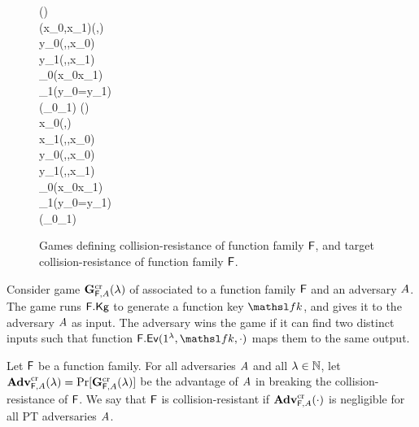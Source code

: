 
\begin{figure}[t]
{
\vspace{-1.0em} %
  {
    \FKey\getsr\Kg{\FF}(\secIn)\\
	(x_0,x_1)\getsr\advA(\secIn,\FKey)\\
	y_0\gets\Ev{\FF}(\secIn,\FKey,x_0)\\
	y_1\gets\Ev{\FF}(\secIn,\FKey,x_1)\\
	\win_0\gets(x_0\neq x_1)\\
	\win_1\gets(y_0=y_1)\\
	\pcreturn (\win_0\land\win_1)
  }
}
{
\vspace{-1.0em} %
  {
    \FKey\getsr\Kg{\FF}(\secIn)\\
	x_0\getsr\Dom{\FF}(\secParam,\FKey)\\
	x_1\getsr\advA(\secIn,\FKey,x_0)\\
	y_0\gets\Ev{\FF}(\secIn,\FKey,x_0)\\
	y_1\gets\Ev{\FF}(\secIn,\FKey,x_1)\\
	\win_0\gets(x_0\neq x_1)\\
	\win_1\gets(y_0=y_1)\\
	\pcreturn (\win_0\land\win_1)
  }
}
\figvspace
\caption{Games defining
           collision-resistance of function family $\mathsf{F}$,
		   and target collision-resistance of function family $\mathsf{F}$.}
\label{fig-ff-cr}
\label{fig-ff-tcr}
\hrulefill
\end{figure}

Consider game $\mathbf{G}^{\rm cr}_{\mathsf{F},A}(\lambda)$ of  associated to a function family $\mathsf{F}$ and an adversary $A$.
The game runs $\mathsf{F}.\mathsf{Kg}$ to generate a function key $\FKey$, and gives it to the adversary $A$ as input.
The adversary wins the game if it can find two distinct inputs such that function $\Ev{\FF}(\secIn,\FKey,\cdot)$ maps them to the same output.
\begin{defn}
  Let $\mathsf{F}$ be a function family.
  For all adversaries $A$ and all $\lambda\in{{\mathbb N}}$, let $\mathbf{Adv}^{\rm cr}_{\mathsf{F},A}(\lambda)=\Pr[\mathbf{G}^{\rm cr}_{\mathsf{F},A}(\lambda)]$ be the advantage of $A$ in breaking the collision-resistance of $\mathsf{F}$.
  We say that $\mathsf{F}$ is collision-resistant if $\mathbf{Adv}^{\rm cr}_{\mathsf{F},A}(\cdot)$ is negligible for all PT adversaries $A$.
\end{defn}

